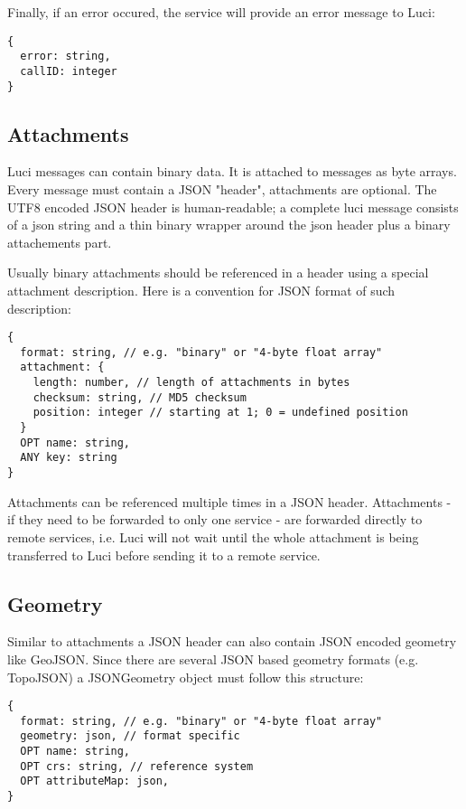 Finally, if an error occured, the service will provide an error message to Luci:
\begin{lstlisting}
{
  error: string,
  callID: integer
}
\end{lstlisting}

\subsection{Attachments}

Luci messages can contain binary data. It is attached to messages as byte arrays. Every message must contain a JSON "header", attachments are optional. The UTF8 encoded JSON header is human-readable; a complete luci message consists of a json string and a thin binary wrapper around the json header plus a binary attachements part.

Usually binary attachments should be referenced in a header using a special attachment description. Here is a convention for JSON format of such description:

\begin{lstlisting}
{
  format: string, // e.g. "binary" or "4-byte float array"
  attachment: {
    length: number, // length of attachments in bytes
    checksum: string, // MD5 checksum
    position: integer // starting at 1; 0 = undefined position
  }
  OPT name: string,
  ANY key: string
}
\end{lstlisting}

Attachments can be referenced multiple times in a JSON header. Attachments - if they need to be forwarded to only one service - are forwarded directly to remote services, i.e. Luci will not wait until the whole attachment is being transferred to Luci before sending it to a remote service.

\subsection{Geometry}
Similar to attachments a JSON header can also contain JSON encoded geometry like GeoJSON. Since there are several JSON based geometry formats (e.g. TopoJSON) a JSONGeometry object must follow this structure:

\begin{lstlisting}
{
  format: string, // e.g. "binary" or "4-byte float array"
  geometry: json, // format specific
  OPT name: string,
  OPT crs: string, // reference system
  OPT attributeMap: json,
}
\end{lstlisting}
